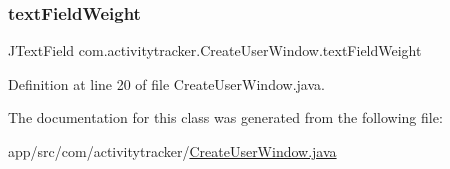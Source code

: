 \subsubsection{\texorpdfstring{text\+Field\+Weight}{textFieldWeight}}
{\footnotesize\ttfamily J\+Text\+Field com.\+activitytracker.\+Create\+User\+Window.\+text\+Field\+Weight\hspace{0.3cm}{\ttfamily [private]}}



Definition at line 20 of file Create\+User\+Window.\+java.



The documentation for this class was generated from the following file\+:\begin{DoxyCompactItemize}
\item 
app/src/com/activitytracker/\mbox{\hyperlink{_create_user_window_8java}{Create\+User\+Window.\+java}}\end{DoxyCompactItemize}
